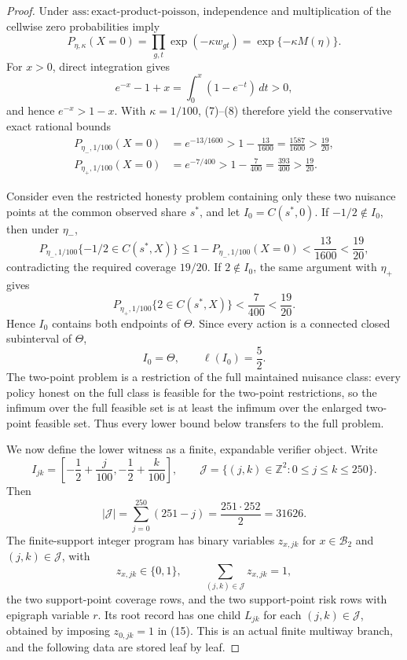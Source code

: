 \documentclass{article}
\begin{document}
\begin{proof}
Under \(\mathrm{ass{:}exact\text{-}product\text{-}poisson}\), independence and multiplication of the cellwise zero probabilities imply
\[
 P_{\eta,\kappa}(X=0)
 =\prod_{g,t}\exp(-\kappa w_{gt})
 =\exp\{-\kappa M(\eta)\}.
\tag{8}
\]
For \(x>0\), direct integration gives
\[
 e^{-x}-1+x=\int_0^x(1-e^{-t})\,dt>0,
\]
and hence \(e^{-x}>1-x\). With \(\kappa=1/100\), (7)--(8) therefore yield the conservative exact rational bounds
\[
 \begin{aligned}
 P_{\eta_-,1/100}(X=0)
 &=e^{-13/1600}>1-\frac{13}{1600}
 =\frac{1587}{1600}>\frac{19}{20},\\
 P_{\eta_+,1/100}(X=0)
 &=e^{-7/400}>1-\frac7{400}
 =\frac{393}{400}>\frac{19}{20}.
 \end{aligned}
\tag{9}
\]

Consider even the restricted honesty problem containing only these two nuisance points at the common observed share \(s^*\), and let \(I_0=C(s^*,0)\). If \(-1/2\notin I_0\), then under \(\eta_-\),
\[
 P_{\eta_-,1/100}\{-1/2\in C(s^*,X)\}
 \le 1-P_{\eta_-,1/100}(X=0)
 <\frac{13}{1600}<\frac{19}{20},
\tag{10}
\]
contradicting the required coverage \(19/20\). If \(2\notin I_0\), the same argument with \(\eta_+\) gives
\[
 P_{\eta_+,1/100}\{2\in C(s^*,X)\}
 <\frac7{400}<\frac{19}{20}.
\tag{11}
\]
Hence \(I_0\) contains both endpoints of \(\Theta\). Since every action is a connected closed subinterval of \(\Theta\),
\[
 I_0=\Theta,
 \qquad \ell(I_0)=\frac52.
\tag{12}
\]
The two-point problem is a restriction of the full maintained nuisance class: every policy honest on the full class is feasible for the two-point restrictions, so the infimum over the full feasible set is at least the infimum over the enlarged two-point feasible set. Thus every lower bound below transfers to the full problem.

We now define the lower witness as a finite, expandable verifier object. Write
\[
 I_{jk}=\left[-\frac12+\frac j{100},-\frac12+\frac k{100}\right],
 \qquad
 \mathscr J=\{(j,k)\in\mathbb Z^2:0\le j\le k\le250\}.
\tag{13}
\]
Then
\[
 |\mathscr J|=\sum_{j=0}^{250}(251-j)
 =\frac{251\cdot252}{2}=31626.
\tag{14}
\]
The finite-support integer program has binary variables \(z_{x,jk}\) for \(x\in\mathcal B_2\) and \((j,k)\in\mathscr J\), with
\[
 z_{x,jk}\in\{0,1\},
 \qquad
 \sum_{(j,k)\in\mathscr J}z_{x,jk}=1,
\tag{15}
\]
the two support-point coverage rows, and the two support-point risk rows with epigraph variable \(r\). Its root record has one child \(L_{jk}\) for each \((j,k)\in\mathscr J\), obtained by imposing \(z_{0,jk}=1\) in (15). This is an actual finite multiway branch, and the following data are stored leaf by leaf.


\end{proof}
\end{document}
